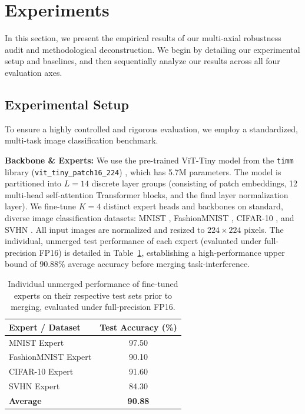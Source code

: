 \section{Experiments}
\label{submission:sec:experiments}

In this section, we present the empirical results of our multi-axial robustness audit and methodological deconstruction. We begin by detailing our experimental setup and baselines, and then sequentially analyze our results across all four evaluation axes.

\subsection{Experimental Setup}
To ensure a highly controlled and rigorous evaluation, we employ a standardized, multi-task image classification benchmark. 

\textbf{Backbone \& Experts:} We use the pre-trained ViT-Tiny model from the \texttt{timm} library (\texttt{vit\_tiny\_patch16\_224}) \cite{wightman2019timm}, which has 5.7M parameters. The model is partitioned into $L=14$ discrete layer groups (consisting of patch embeddings, 12 multi-head self-attention Transformer blocks, and the final layer normalization layer). We fine-tune $K=4$ distinct expert heads and backbones on standard, diverse image classification datasets: MNIST \cite{lecun1998mnist}, FashionMNIST \cite{xiao2017fashion}, CIFAR-10 \cite{krizhevsky2009cifar}, and SVHN \cite{netzer2011svhn}. All input images are normalized and resized to $224 \times 224$ pixels. The individual, unmerged test performance of each expert (evaluated under full-precision FP16) is detailed in Table~\ref{tab:expert_accs}, establishing a high-performance upper bound of $90.88\%$ average accuracy before merging task-interference.

\begin{table}[ht]
\caption{Individual unmerged performance of fine-tuned experts on their respective test sets prior to merging, evaluated under full-precision FP16.}
\label{tab:expert_accs}
\vskip 0.1in
\begin{center}
\begin{small}
\begin{sc}
\begin{tabular}{lc}
\toprule
Expert / Dataset & Test Accuracy (\%) \\
\midrule
MNIST Expert & 97.50 \\
FashionMNIST Expert & 90.10 \\
CIFAR-10 Expert & 91.60 \\
SVHN Expert & 84.30 \\
\midrule
\textbf{Average} & \textbf{90.88} \\
\bottomrule
\end{tabular}
\end{sc}
\end{small}
\end{center}
\vskip -0.1in
\end{table}


